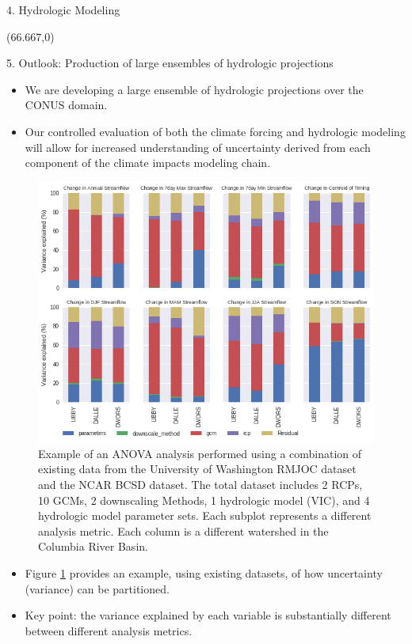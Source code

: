 \documentclass{beamer}
\begin{document}
\begin{frame}{}
\begin{columns}
\begin{column}{.3333\paperwidth}
\begin{textblock}{\textwidth \TPHorizModule}
\begin{block}{4. Hydrologic Modeling}
    \end{block}
   \end{textblock}



   \begin{textblock}{\textwidth \TPHorizModule}(66.667,0)
    \begin{block}{5. Outlook: Production of large ensembles of hydrologic projections}

     \begin{itemize}
      \justifying
      \item We are developing a large ensemble of hydrologic projections over the CONUS domain.
      \item Our controlled evaluation of both the climate forcing and hydrologic modeling will allow for increased understanding of uncertainty derived from each component of the climate impacts modeling chain.
     \end{itemize}

     \begin{figure}
      \center\includegraphics[width=0.7\linewidth]{figures/anova.png}
      \caption{Example of an ANOVA analysis performed using a combination of existing data from the University of Washington RMJOC dataset and the NCAR BCSD dataset. The total dataset includes 2 RCPs, 10 GCMs, 2 downscaling Methods, 1 hydrologic model (VIC), and 4 hydrologic model parameter sets. Each subplot represents a different analysis metric. Each column is a different watershed in the Columbia River Basin.
       \label{fig:anova}}
     \end{figure}

     \begin{itemize}
      \justifying
      \item Figure \ref{fig:anova} provides an example, using existing datasets, of how uncertainty (variance) can be partitioned.
      \item Key point: the variance explained by each variable is substantially different between different analysis metrics.
     \end{itemize}


\end{block}
\end{textblock}
\end{column}
\end{columns}
\end{frame}
\end{document}
